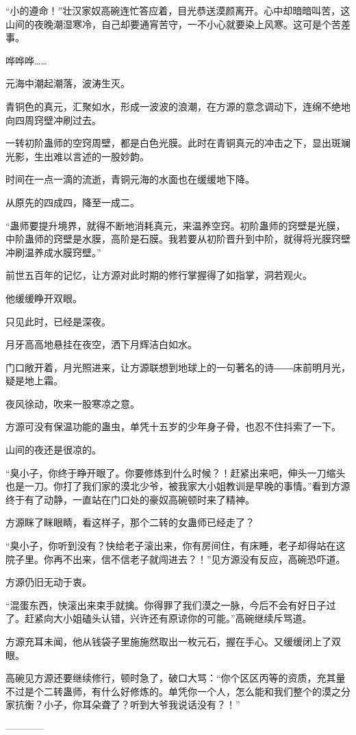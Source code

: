 \begin{this_body}
“小的遵命！”壮汉家奴高碗连忙答应着，目光恭送漠颜离开。心中却暗暗叫苦，这山间的夜晚潮湿寒冷，自己却要通宵苦守，一不小心就要染上风寒。这可是个苦差事。

哗哗哗……

元海中潮起潮落，波涛生灭。

青铜色的真元，汇聚如水，形成一波波的浪潮，在方源的意念调动下，连绵不绝地向四周窍壁冲刷过去。

一转初阶蛊师的空窍周壁，都是白色光膜。此时在青铜真元的冲击之下，显出斑斓光影，生出难以言述的一股妙韵。

时间在一点一滴的流逝，青铜元海的水面也在缓缓地下降。

从原先的四成四，降至一成二。

“蛊师要提升境界，就得不断地消耗真元，来温养空窍。初阶蛊师的窍壁是光膜，中阶蛊师的窍壁是水膜，高阶是石膜。我若要从初阶晋升到中阶，就得将光膜窍壁冲刷温养成水膜窍壁。”

前世五百年的记忆，让方源对此时期的修行掌握得了如指掌，洞若观火。

他缓缓睁开双眼。

只见此时，已经是深夜。

月牙高高地悬挂在夜空，洒下月辉洁白如水。

门口敞开着，月光照进来，让方源联想到地球上的一句著名的诗――床前明月光，疑是地上霜。

夜风徐动，吹来一股寒凉之意。

方源可没有保温功能的蛊虫，单凭十五岁的少年身子骨，也忍不住抖索了一下。

山间的夜还是很凉的。

“臭小子，你终于睁开眼了。你要修炼到什么时候？！赶紧出来吧，伸头一刀缩头也是一刀。你打了我们家的漠北少爷，被我家大小姐教训是早晚的事情。”看到方源终于有了动静，一直站在门口处的豪奴高碗顿时来了精神。

方源眯了眯眼睛，看这样子，那个二转的女蛊师已经走了？

“臭小子，你听到没有？快给老子滚出来，你有房间住，有床睡，老子却得站在这院子里。你再不出来，信不信老子就闯进去？！”见方源没有反应，高碗恐吓道。

方源仍旧无动于衷。

“混蛋东西，快滚出来束手就擒。你得罪了我们漠之一脉，今后不会有好日子过了。赶紧向大小姐磕头认错，兴许还有原谅你的可能。”高碗继续斥骂道。

方源充耳未闻，他从钱袋子里施施然取出一枚元石，握在手心。又缓缓闭上了双眼。

高碗见方源还要继续修行，顿时急了，破口大骂：“你个区区丙等的资质，充其量不过是个二转蛊师，有什么好修炼的。单凭你一个人，怎么能和我们整个的漠之分家抗衡？小子，你耳朵聋了？听到大爷我说话没有？！”

------------

\end{this_body}

